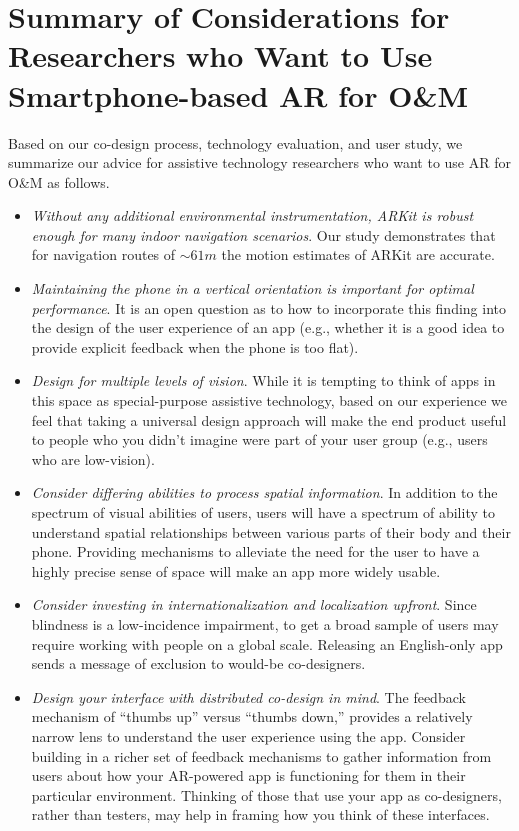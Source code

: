 \documentclass[chi_draft]{sigchi}
\newcommand{\OM}{O\&M\xspace}
\begin{document}
\section{Summary of Considerations for Researchers who Want to Use Smartphone-based AR for \OM}

Based on our co-design process, technology evaluation, and user study, we summarize our advice for assistive technology researchers who want to use AR for \OM as follows.

\begin{itemize}
\item \emph{Without any additional environmental instrumentation, ARKit is robust enough for many indoor navigation scenarios}.  Our study demonstrates that for navigation routes of $\sim61m$ the motion estimates of ARKit are accurate.
\item \emph{Maintaining the phone in a vertical orientation is important for optimal performance}.  It is an open question as to how to incorporate this finding into the design of the user experience of an app (e.g., whether it is a good idea to provide explicit feedback when the phone is too flat).
\item \emph{Design for multiple levels of vision}.  While it is tempting to think of apps in this space as special-purpose assistive technology, based on our experience we feel that taking a universal design approach will make the end product useful to people who you didn't imagine were part of your user group (e.g., users who are low-vision).
\item \emph{Consider differing abilities to process spatial information}.  In addition to the spectrum of visual abilities of users, users will have a spectrum of ability to understand spatial relationships between various parts of their body and their phone.  Providing mechanisms to alleviate the need for the user to have a highly precise sense of space will make an app more widely usable.
\item \emph{Consider investing in internationalization and localization upfront}.  Since blindness is a low-incidence impairment, to get a broad sample of users may require working with people on a global scale.  Releasing an English-only app sends a message of exclusion to would-be co-designers.

\item \emph{Design your interface with distributed co-design in mind}.  The feedback mechanism of ``thumbs up'' versus ``thumbs down,'' provides a relatively narrow lens to understand the user experience using the app.  Consider building in a richer set of feedback mechanisms to gather information from users about how your AR-powered app is functioning for them in their particular environment.  Thinking of those that use your app as co-designers, rather than testers, may help in framing how you think of these interfaces.


\end{itemize}
\end{document}
